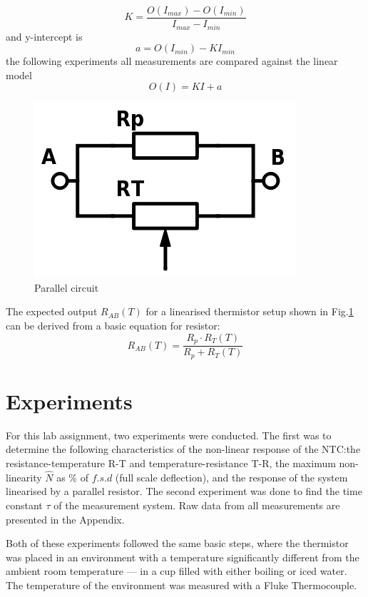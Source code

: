 \documentclass[a4,11pt]{article}
\begin{document}
$$K=\frac{O(I_{max})-O(I_{min})}{I_{max}-I_{min}}$$
and y-intercept is
\begin{equation}
  \label{eq:intercept}
  a=O(I_{min})-KI_{min}
\end{equation}
the following experiments all measurements are compared against the linear model
\begin{equation}
  O(I)=KI+a
\end{equation}
\begin{figure}[H]
  \label{fig:parallel}
  \centering
  \includegraphics[width=0.75\columnwidth]{parallel.png}
  \caption{
    Parallel circuit
  }
\end{figure}
The expected output $R_{AB}(T)$ for a linearised thermistor setup shown in Fig.\ref{fig:parallel} can be derived from a basic equation for resistor:
\begin{equation}
  \label{eq:Rab}
  R_{AB}(T)=\frac{R_p\cdot R_T(T)}{R_p+R_T(T)}
\end{equation}
\section{Experiments}
For this lab assignment, two experiments were conducted. The first was to determine the following characteristics of the non-linear response of the NTC:\@ the resistance-temperature R-T and temperature-resistance T-R, the maximum non-linearity $\hat N$ as \% of $f.s.d$ (full scale deflection), and the response of the system linearised by a parallel resistor. The second experiment was done to find the time constant $\tau$ of the measurement system. Raw data from all measurements are presented in the Appendix.

Both of these experiments followed the same basic steps, where the thermistor was placed in an environment with a temperature significantly different from the ambient room temperature --- in a cup filled with either boiling or iced water. The temperature of the environment was measured with a Fluke Thermocouple.
\end{document}
